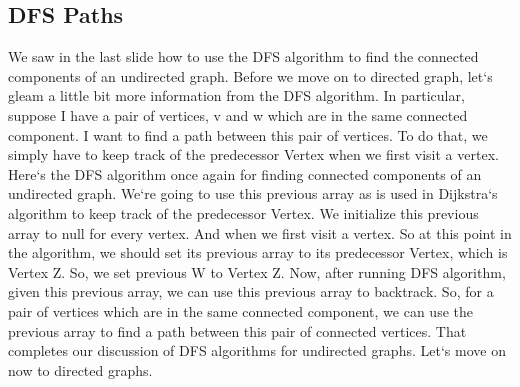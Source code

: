 \subsection{DFS  Paths}
We saw in the last slide how to use the DFS algorithm to find the connected components of an undirected graph.
Before we move on to directed graph, let`s gleam a little bit more information from the DFS algorithm.
In particular, suppose I have a pair of vertices, v and w which are in the same connected component.
I want to find a path between this pair of vertices.
To do that, we simply have to keep track of the predecessor Vertex when we first visit a vertex.
Here`s the DFS algorithm once again for finding connected components of an undirected graph.
We`re going to use this previous array as is used in Dijkstra`s algorithm to keep track of the predecessor Vertex.
We initialize this previous array to null for every vertex.
And when we first visit a vertex.
So at this point in the algorithm, we should set its previous array to its predecessor Vertex, which is Vertex Z\@.
So, we set previous W to Vertex Z\@.
Now, after running DFS algorithm, given this previous array, we can use this previous array to backtrack.
So, for a pair of vertices which are in the same connected component, we can use the previous array to find a path between this pair of connected vertices.
That completes our discussion of DFS algorithms for undirected graphs.
Let`s move on now to directed graphs.

